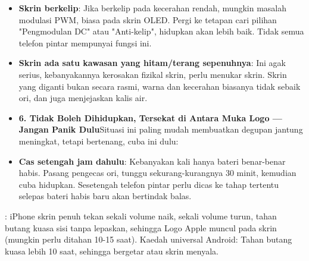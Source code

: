 
\begin{itemize}
  \item \textbf{Skrin berkelip}: Jika berkelip pada kecerahan rendah, mungkin masalah modulasi PWM, biasa pada skrin OLED. Pergi ke tetapan cari pilihan "Pengmodulan DC" atau "Anti-kelip", hidupkan akan lebih baik. Tidak semua telefon pintar mempunyai fungsi ini.
  \item \textbf{Skrin ada satu kawasan yang hitam/terang sepenuhnya}: Ini agak serius, kebanyakannya kerosakan fizikal skrin, perlu menukar skrin. Skrin yang diganti bukan secara rasmi, warna dan kecerahan biasanya tidak sebaik ori, dan juga menjejaskan kalis air.
  \item \textbf{6. Tidak Boleh Dihidupkan, Tersekat di Antara Muka Logo — Jangan Panik Dulu}Situasi ini paling mudah membuatkan degupan jantung meningkat, tetapi bertenang, cuba ini dulu:
  \item \textbf{Cas setengah jam dahulu}: Kebanyakan kali hanya bateri benar-benar habis. Pasang pengecas ori, tunggu sekurang-kurangnya 30 minit, kemudian cuba hidupkan. Sesetengah telefon pintar perlu dicas ke tahap tertentu selepas bateri habis baru akan bertindak balas.
\end{itemize}


: iPhone skrin penuh tekan sekali volume naik, sekali volume turun, tahan butang kuasa sisi tanpa lepaskan, sehingga Logo Apple muncul pada skrin (mungkin perlu ditahan 10-15 saat). Kaedah universal Android: Tahan butang kuasa lebih 10 saat, sehingga bergetar atau skrin menyala.

